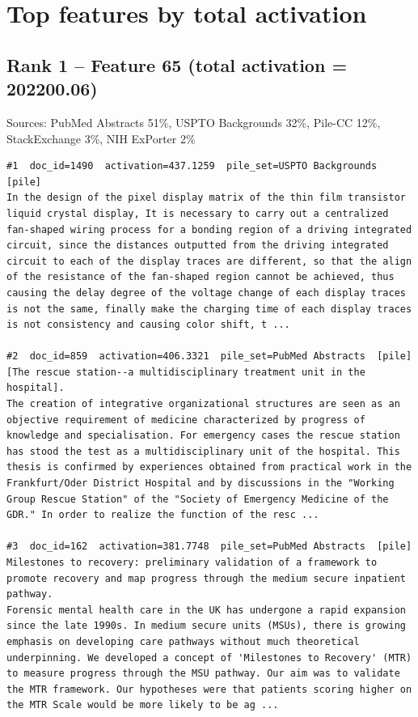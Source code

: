 \section*{Top features by total activation}

\subsection*{Rank 1 -- Feature 65 (total activation = 202200.06)}

Sources: PubMed Abstracts 51\%, USPTO Backgrounds 32\%, Pile-CC 12\%, StackExchange 3\%, NIH ExPorter 2\%

\begin{verbatim}
#1  doc_id=1490  activation=437.1259  pile_set=USPTO Backgrounds  [pile]
In the design of the pixel display matrix of the thin film transistor liquid crystal display, It is necessary to carry out a centralized fan-shaped wiring process for a bonding region of a driving integrated circuit, since the distances outputted from the driving integrated circuit to each of the display traces are different, so that the align of the resistance of the fan-shaped region cannot be achieved, thus causing the delay degree of the voltage change of each display traces is not the same, finally make the charging time of each display traces is not consistency and causing color shift, t ...

#2  doc_id=859  activation=406.3321  pile_set=PubMed Abstracts  [pile]
[The rescue station--a multidisciplinary treatment unit in the hospital].
The creation of integrative organizational structures are seen as an objective requirement of medicine characterized by progress of knowledge and specialisation. For emergency cases the rescue station has stood the test as a multidisciplinary unit of the hospital. This thesis is confirmed by experiences obtained from practical work in the Frankfurt/Oder District Hospital and by discussions in the "Working Group Rescue Station" of the "Society of Emergency Medicine of the GDR." In order to realize the function of the resc ...

#3  doc_id=162  activation=381.7748  pile_set=PubMed Abstracts  [pile]
Milestones to recovery: preliminary validation of a framework to promote recovery and map progress through the medium secure inpatient pathway.
Forensic mental health care in the UK has undergone a rapid expansion since the late 1990s. In medium secure units (MSUs), there is growing emphasis on developing care pathways without much theoretical underpinning. We developed a concept of 'Milestones to Recovery' (MTR) to measure progress through the MSU pathway. Our aim was to validate the MTR framework. Our hypotheses were that patients scoring higher on the MTR Scale would be more likely to be ag ...


\end{verbatim}

